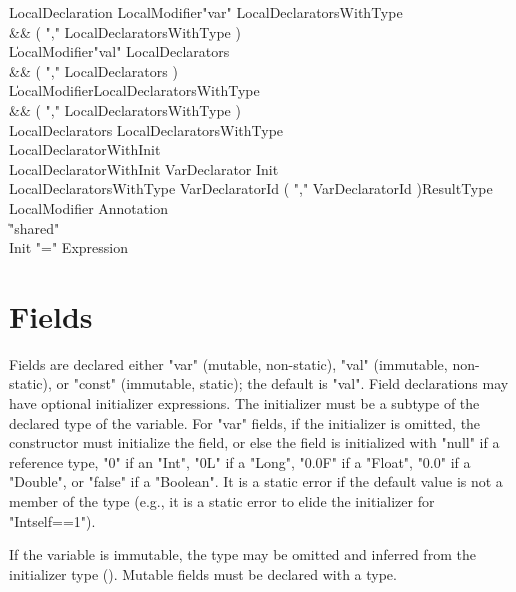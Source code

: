\begin{grammar}
LocalDeclaration
        \: LocalModifier\star \xcd"var" LocalDeclaratorsWithType \\&& ( \xcd"," LocalDeclaratorsWithType )\star \\
        \| LocalModifier\star \xcd"val" LocalDeclarators \\&& ( \xcd"," LocalDeclarators )\star \\
        \| LocalModifier\star LocalDeclaratorsWithType \\&& ( \xcd"," LocalDeclaratorsWithType )\star \\
LocalDeclarators
        \: LocalDeclaratorsWithType \\
        \: LocalDeclaratorWithInit \\
LocalDeclaratorWithInit
        \: VarDeclarator Init \\
LocalDeclaratorsWithType
        \: VarDeclaratorId
                ( \xcd"," VarDeclaratorId )\star ResultType \\
LocalModifier \: Annotation \\
              \| \xcd"shared" \\
Init \: \xcd"=" Expression \\
\end{grammar}

\section{Fields}
Fields are declared either \xcd"var" (mutable, non-static),
\xcd"val" (immutable, non-static), or \xcd"const" (immutable, static);
the default is \xcd"val".
Field declarations may have optional
initializer expressions.  The initializer must be a subtype of
the declared type of the variable.
For \xcd"var" fields,
if the initializer is omitted, the constructor must initialize
the field, or else the field is initialized with
\xcd"null" if a reference type, \xcd"0" if an \xcd"Int", \xcd"0L"
if a \xcd"Long",
\xcd"0.0F" if a \xcd"Float", \xcd"0.0" if a \xcd"Double", or
\xcd"false" if a \xcd"Boolean".  It is a static error if the
default value is not a member of the type (e.g., it is a static
error to elide the initializer for \xcd"Int{self==1}").

If the variable is immutable,
the type may be omitted and
inferred from the initializer type ().
Mutable fields must be declared with a type.

